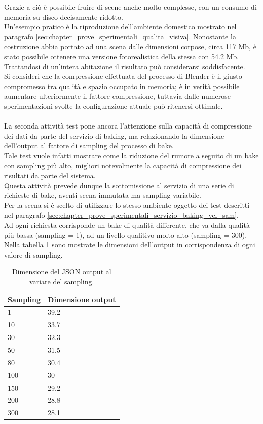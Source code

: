 Grazie a ciò è possibile fruire di scene anche molto complesse, con un consumo di memoria su disco decisamente ridotto. 
\\
Un’esempio pratico è la riproduzione dell’ambiente domestico mostrato nel paragrafo \ref{sec:chapter_prove_sperimentali_qualita_visiva}. Nonostante la costruzione abbia portato ad una scena dalle dimensioni corpose, circa 117 Mb, è stato possibile ottenere una versione fotorealistica della stessa con 54.2 Mb. Trattandosi di un’intera abitazione il risultato può considerarsi soddisfacente.
\\
Si consideri che la compressione effettuata del processo di Blender è il giusto compromesso tra qualità e spazio occupato in memoria; è in verità possibile aumentare ulteriormente il fattore compressione, tuttavia dalle numerose sperimentazioni svolte la configurazione attuale può ritenersi ottimale.
\\
\\
La seconda attività test pone ancora l’attenzione sulla capacità di compressione dei dati da parte del servizio di baking, ma relazionando la dimensione dell’output al fattore di sampling del processo di bake. 
\\
Tale test vuole infatti mostrare come la riduzione del rumore a seguito di un bake con sampling più alto, migliori notevolmente la capacità di compressione dei risultati da parte del sistema.
\\ 
Questa attività prevede dunque la sottomissione al servizio di una serie di richieste di bake, aventi scena immutata ma sampling variabile. 
\\
Per la scena si è scelto di utilizzare lo stesso ambiente oggetto dei test descritti nel paragrafo \ref{sec:chapter_prove_sperimentali_servizio_baking_vel_sam}. 
\\
Ad ogni richiesta corrisponde un bake di qualità differente, che va dalla qualità più bassa (sampling = 1), ad un livello qualitivo molto alto (sampling = 300). Nella tabella \ref{table:dim_sam} sono mostrate le dimensioni dell’output in corrispondenza di ogni valore di sampling.

\begin{table}[]
\centering
\caption[Dimensioni output variando sampling]{Dimensione del JSON output al variare del sampling.}
\begin{tabular}{|l|l|}
\hline
\textbf{Sampling} & \textbf{Dimensione output} \\ \hline
1 & 39.2 \\ \hline
10 & 33.7 \\ \hline
30 & 32.3 \\ \hline
50 & 31.5 \\ \hline
80 & 30.4 \\ \hline
100 & 30 \\ \hline
150 & 29.2 \\ \hline
200 & 28.8 \\ \hline
300 & 28.1 \\ \hline
\end{tabular}
\label{table:dim_sam}
\end{table}

